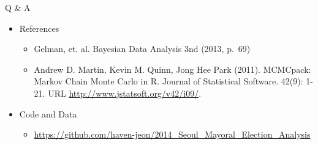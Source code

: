 \documentclass[ignorenonframetext,]{beamer}
\begin{document}
\begin{frame}{Q \& A}

\begin{itemize}
\itemsep1pt\parskip0pt
\item
  References

  \begin{itemize}
  \itemsep1pt\parskip0pt
  \item
    Gelman, et. al. Bayesian Data Analysis 3nd (2013, p.~69)
  \item
    Andrew D. Martin, Kevin M. Quinn, Jong Hee Park (2011). MCMCpack:
    Markov Chain Monte Carlo in R. Journal of Statistical Software.
    42(9): 1-21. URL \url{http://www.jstatsoft.org/v42/i09/}.
  \end{itemize}
\item
  Code and Data

  \begin{itemize}
  \itemsep1pt\parskip0pt
  \item
    \url{https://github.com/haven-jeon/2014_Seoul_Mayoral_Election_Analysis}
  \end{itemize}
\end{itemize}

\end{frame}
\end{document}
